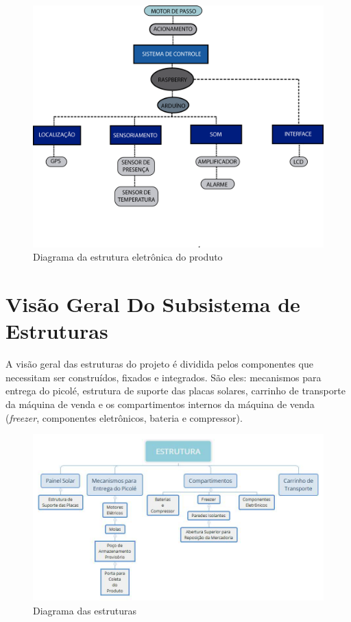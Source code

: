 \begin{figure}[H]
	\centering

    \includegraphics[width=1.05\textwidth]{figuras/diagrama}
    \caption{Diagrama da estrutura eletrônica do produto}
    \label{fig:diagrama}
\end{figure}

\newpage

\section{Visão Geral Do Subsistema de Estruturas}

A visão geral das estruturas do projeto é dividida pelos componentes que necessitam ser construídos, fixados e integrados. São eles: mecanismos para entrega do picolé, estrutura de suporte das placas solares, carrinho de transporte da máquina de venda e os compartimentos internos da máquina de venda (\textit{freezer}, componentes eletrônicos, bateria e compressor).

\begin{figure}[H]
	\centering

    \includegraphics[width=\textwidth]{figuras/Vis_o_Geral_-_ESTRUTURA}
    \caption{Diagrama das estruturas}
    \label{fig:Vis_o_Geral_-_ESTRUTURA}
\end{figure}


